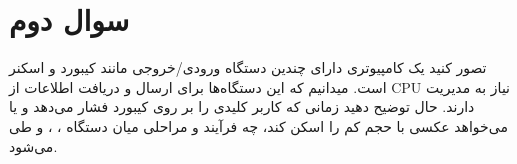 \section{سوال دوم}

تصور کنید یک کامپیوتری دارای چندین دستگاه ورودی/خروجی  مانند کیبورد و اسکنر است. میدانیم که این دستگاه‌ها برای ارسال و دریافت اطلاعات از CPU نیاز به مدیریت دارند. حال توضیح دهید زمانی که کاربر کلیدی را بر روی کیبورد فشار می‌دهد و یا می‌خواهد عکسی با حجم کم را اسکن کند، چه فرآیند و مراحلی میان دستگاه ، ،  و  طی می‌شود.


\begin{qsolve}[]
	
\end{qsolve}